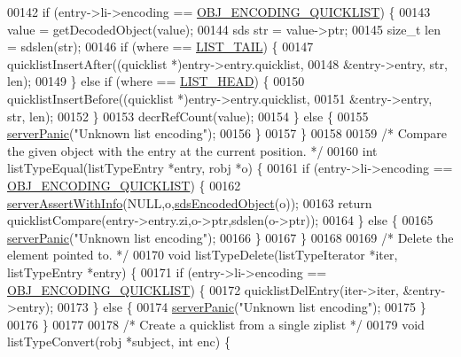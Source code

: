 \begin{DoxyCode}
00142     \textcolor{keywordflow}{if} (entry->li->encoding == \hyperlink{server_8h_aec792aeed6d4bf83966672e6a23043b8}{OBJ\_ENCODING\_QUICKLIST}) \{
00143         value = getDecodedObject(value);
00144         sds str = value->ptr;
00145         size\_t len = sdslen(str);
00146         \textcolor{keywordflow}{if} (where == \hyperlink{server_8h_a745de98bef5b645df56479181803235b}{LIST\_TAIL}) \{
00147             quicklistInsertAfter((quicklist *)entry->entry.quicklist,
00148                                  &entry->entry, str, len);
00149         \} \textcolor{keywordflow}{else} \textcolor{keywordflow}{if} (where == \hyperlink{server_8h_a5fc6a15ca26c6208f66ad2768a3108ef}{LIST\_HEAD}) \{
00150             quicklistInsertBefore((quicklist *)entry->entry.quicklist,
00151                                   &entry->entry, str, len);
00152         \}
00153         decrRefCount(value);
00154     \} \textcolor{keywordflow}{else} \{
00155         \hyperlink{server_8h_a11cc378e7778a830b41240578de3b204}{serverPanic}(\textcolor{stringliteral}{"Unknown list encoding"});
00156     \}
00157 \}
00158 
00159 \textcolor{comment}{/* Compare the given object with the entry at the current position. */}
00160 \textcolor{keywordtype}{int} listTypeEqual(listTypeEntry *entry, robj *o) \{
00161     \textcolor{keywordflow}{if} (entry->li->encoding == \hyperlink{server_8h_aec792aeed6d4bf83966672e6a23043b8}{OBJ\_ENCODING\_QUICKLIST}) \{
00162         \hyperlink{server_8h_a7308f76cbff9a8d3797fe78190b91282}{serverAssertWithInfo}(NULL,o,\hyperlink{server_8h_afcfb5bd97af52d1dbce331745cae030c}{sdsEncodedObject}(o));
00163         \textcolor{keywordflow}{return} quicklistCompare(entry->entry.zi,o->ptr,sdslen(o->ptr));
00164     \} \textcolor{keywordflow}{else} \{
00165         \hyperlink{server_8h_a11cc378e7778a830b41240578de3b204}{serverPanic}(\textcolor{stringliteral}{"Unknown list encoding"});
00166     \}
00167 \}
00168 
00169 \textcolor{comment}{/* Delete the element pointed to. */}
00170 \textcolor{keywordtype}{void} listTypeDelete(listTypeIterator *iter, listTypeEntry *entry) \{
00171     \textcolor{keywordflow}{if} (entry->li->encoding == \hyperlink{server_8h_aec792aeed6d4bf83966672e6a23043b8}{OBJ\_ENCODING\_QUICKLIST}) \{
00172         quicklistDelEntry(iter->iter, &entry->entry);
00173     \} \textcolor{keywordflow}{else} \{
00174         \hyperlink{server_8h_a11cc378e7778a830b41240578de3b204}{serverPanic}(\textcolor{stringliteral}{"Unknown list encoding"});
00175     \}
00176 \}
00177 
00178 \textcolor{comment}{/* Create a quicklist from a single ziplist */}
00179 \textcolor{keywordtype}{void} listTypeConvert(robj *subject, \textcolor{keywordtype}{int} enc) \{

\end{DoxyCode}
